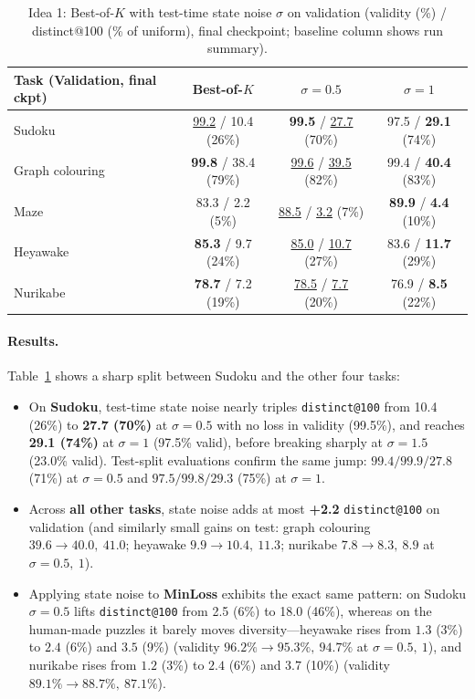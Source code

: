 \documentclass[11pt]{article}
\newcommand{\secbest}[1]{\underline{#1}}
\newcommand{\Bok}{Best-of-$K$}
\begin{document}
\begin{table}[!ht]
  \centering
  \small
  \begin{tabular}{@{}lccc@{}}
    \toprule
    \textbf{Task (Validation, final ckpt)} & \textbf{\Bok{}} & \textbf{$\sigma = 0.5$} & \textbf{$\sigma = 1$} \\
    \midrule
    Sudoku & \secbest{99.2} / 10.4 (26\%) & \textbf{99.5} / \secbest{27.7} (70\%) & 97.5 / \textbf{29.1} (74\%) \\
    Graph colouring & \textbf{99.8} / 38.4 (79\%) & \secbest{99.6} / \secbest{39.5} (82\%) & 99.4 / \textbf{40.4} (83\%) \\
    Maze & 83.3 / 2.2 (5\%) & \secbest{88.5} / \secbest{3.2} (7\%) & \textbf{89.9} / \textbf{4.4} (10\%) \\
    Heyawake & \textbf{85.3} / 9.7 (24\%) & \secbest{85.0} / \secbest{10.7} (27\%) & 83.6 / \textbf{11.7} (29\%) \\
    Nurikabe & \textbf{78.7} / 7.2 (19\%) & \secbest{78.5} / \secbest{7.7} (20\%) & 76.9 / \textbf{8.5} (22\%) \\
    \bottomrule
  \end{tabular}
  \caption{Idea 1: \Bok{} with test-time state noise $\sigma$ on validation (validity (\%) / distinct@100 (\% of uniform), final checkpoint; baseline column shows run summary).}
  \label{tab:idea1}
\end{table}

\paragraph{Results.}
Table~\ref{tab:idea1} shows a sharp split between Sudoku and the other four tasks:
\begin{itemize}
  \item On \textbf{Sudoku}, test-time state noise nearly triples \texttt{distinct@100} from 10.4 (26\%) to \textbf{27.7 (70\%)} at $\sigma=0.5$ with no loss in validity (99.5\%), and reaches \textbf{29.1 (74\%)} at $\sigma=1$ (97.5\% valid), before breaking sharply at $\sigma=1.5$ (23.0\% valid). Test-split evaluations confirm the same jump: $99.4 / 99.9 / 27.8$ (71\%) at $\sigma=0.5$ and $97.5 / 99.8 / 29.3$ (75\%) at $\sigma=1$.
  \item Across \textbf{all other tasks}, state noise adds at most \textbf{+2.2} \texttt{distinct@100} on validation (and similarly small gains on test: graph colouring $39.6 \to 40.0,\ 41.0$; heyawake $9.9 \to 10.4,\ 11.3$; nurikabe $7.8 \to 8.3,\ 8.9$ at $\sigma=0.5,\ 1$).
  \item Applying state noise to \textbf{MinLoss} exhibits the exact same pattern: on Sudoku $\sigma=0.5$ lifts \texttt{distinct@100} from 2.5 (6\%) to 18.0 (46\%), whereas on the human-made puzzles it barely moves diversity---heyawake rises from $1.3$ (3\%) to $2.4$ (6\%) and $3.5$ (9\%) (validity $96.2\% \to 95.3\%,\ 94.7\%$ at $\sigma=0.5,\ 1$), and nurikabe rises from $1.2$ (3\%) to $2.4$ (6\%) and $3.7$ (10\%) (validity $89.1\% \to 88.7\%,\ 87.1\%$).
\end{itemize}
\end{document}
